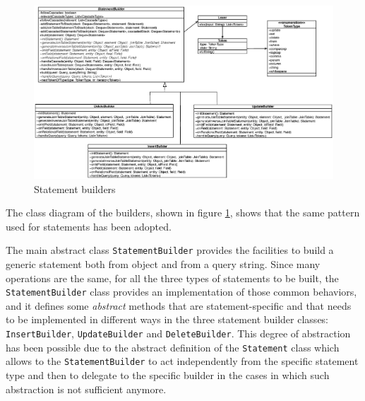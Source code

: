 \begin{figure}[tbh]
  \includegraphics[width=16cm]{images/builders}
  \caption{Statement builders}
  \label{fig:builders}
\end{figure} 

\noindent The class diagram of the builders, shown in figure \ref{fig:builders}, shows that the same pattern used for statements has been adopted.

\noindent The main abstract class \texttt{StatementBuilder} provides the facilities to build a generic statement both from object and from a query string.
Since many operations are the same, for all the three types of statements to be built, the \texttt{StatementBuilder} class provides an implementation of those common behaviors, and it defines some \textit{abstract} methods that are statement-specific and that needs to be implemented in different ways in the three statement builder classes: \texttt{InsertBuilder}, \texttt{UpdateBuilder} and \texttt{DeleteBuilder}.
This degree of abstraction has been possible due to the abstract definition of the \texttt{Statement} class which allows to the \texttt{StatementBuilder} to act independently from the specific statement type and then to delegate to the specific builder in the cases in which such abstraction is not sufficient anymore.

